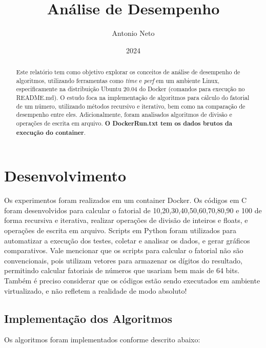 \documentclass[12pt]{article}
\title{Análise de Desempenho}
\author{Antonio Neto}
\date{2024}
\begin{document}
\maketitle

\begin{abstract}
Este relatório tem como objetivo explorar os conceitos de análise de desempenho de algoritmos, utilizando ferramentas como \textit{time} e \textit{perf} em um ambiente Linux, especificamente na distribuição Ubuntu 20.04 do Docker (comandos para execução no README.md). O estudo foca na implementação de algoritmos para cálculo do fatorial de um número, utilizando métodos recursivo e iterativo, bem como na comparação de desempenho entre eles. Adicionalmente, foram analisados algoritmos de divisão e operações de escrita em arquivo. \textbf{O DockerRun.txt tem os dados brutos da execução do container}.
\end{abstract}

\tableofcontents

\newpage

\section{Desenvolvimento}
Os experimentos foram realizados em um container Docker. Os códigos em C foram desenvolvidos para calcular o fatorial de 10,20,30,40,50,60,70,80,90 e 100 de forma recursiva e iterativa, realizar operações de divisão de inteiros e floats, e operações de escrita em arquivo. Scripts em Python foram utilizados para automatizar a execução dos testes, coletar e analisar os dados, e gerar gráficos comparativos. Vale mencionar que os scripts para calcular o fatorial não são convencionais, pois utilizam vetores para armazenar os dígitos do resultado, permitindo calcular fatoriais de números que usariam bem mais de 64 bits. Também é preciso considerar que os códigos estão sendo executados em ambiente virtualizado, e não refletem a realidade de modo absoluto!

\subsection{Implementação dos Algoritmos}
Os algoritmos foram implementados conforme descrito abaixo:
\end{document}

